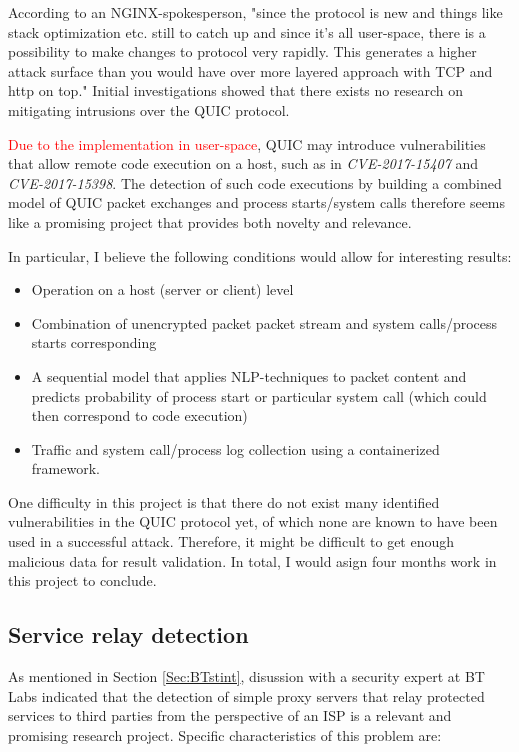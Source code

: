 \documentclass[a4paper,12pt,twoside]{article}
\begin{document}
According to an NGINX-spokesperson, "since the protocol is new and things like stack optimization etc. still to catch up and since it's all user-space, there is a possibility to make changes to protocol very rapidly. This generates a higher attack surface than you would have over more layered approach with TCP and http on top." Initial investigations showed that there exists no research on mitigating intrusions over the QUIC protocol.%


\textcolor{red}{Due to the implementation in user-space}, QUIC may introduce vulnerabilities that allow remote code execution on a host, such as in \textit{CVE-2017-15407} and \textit{CVE-2017-15398}. The detection of such code executions by building a combined model of QUIC packet exchanges and process starts/system calls therefore seems like a promising project that provides both novelty and relevance.

In particular, I believe the following conditions would allow for interesting results:
\begin{itemize}
\item Operation on a host (server or client) level
\item Combination of unencrypted packet packet stream and system calls/process starts corresponding
\item A sequential model that applies NLP-techniques to packet content and predicts probability of process start or particular system call (which could then correspond to code execution)
\item Traffic and system call/process log collection using a containerized framework.
\end{itemize}

One difficulty in this project is that there do not exist many identified vulnerabilities in the QUIC protocol yet, of which none are known to have been used in a successful attack. Therefore, it might be difficult to get enough malicious data for result validation. In total, I would asign four months work in this project to conclude.




\subsection{Service relay detection}\label{Sec:Relay}

As mentioned in Section \ref{Sec:BTstint}, disussion with a security expert at BT Labs indicated that the detection of simple proxy servers that relay protected services to third parties from the perspective of an ISP is a relevant and promising research project. Specific characteristics of this problem are:
\end{document}
